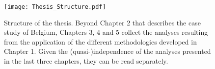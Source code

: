 \begin{figure}[htbp!]
\centering
\texttt{[image: Thesis\_Structure.pdf]}
\caption{Structure of the thesis. Beyond Chapter 2 that describes the case study of Belgium, Chapters 3, 4 and 5 collect the analyses resulting from the application of the different methodologies developed in Chapter 1. Given the (quasi-)independence of the analyses presented in the last three chapters, they can be read separately.}
\label{fig:intro:Thesis_Structure}
\end{figure}